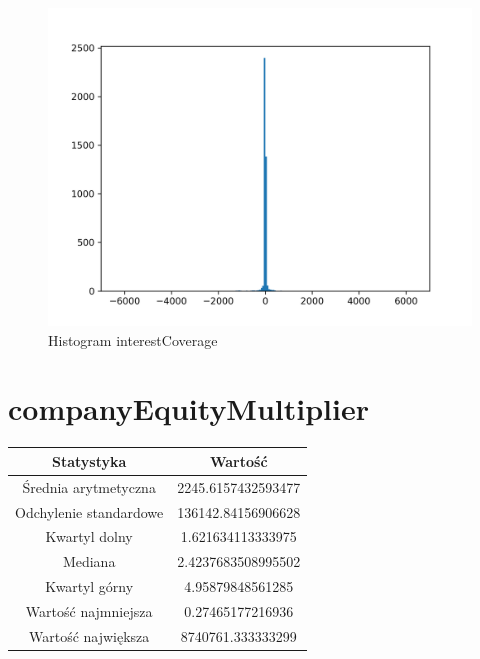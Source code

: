 \documentclass{article}
\begin{document}
\begin{figure}[h!]
    \includegraphics[width=\linewidth]{variables/interestCoverage.png}
    \caption{Histogram interestCoverage }
\end{figure}\section{ companyEquityMultiplier }

\begin{center}
    \begin{tabular}{|c | c|} 
    \hline
    Statystyka & Wartość \\
    \hline\hline
    Średnia arytmetyczna & 2245.6157432593477 \\ 
    \hline
    Odchylenie standardowe & 136142.84156906628 \\
    \hline
    Kwartyl dolny & 1.621634113333975 \\
    \hline
    Mediana & 2.4237683508995502 \\
    \hline
    Kwartyl górny & 4.95879848561285 \\
    \hline
    Wartość najmniejsza & 0.27465177216936 \\
    \hline
    Wartość największa & 8740761.333333299 \\
    \hline
   \end{tabular}
\end{center}
\end{document}
